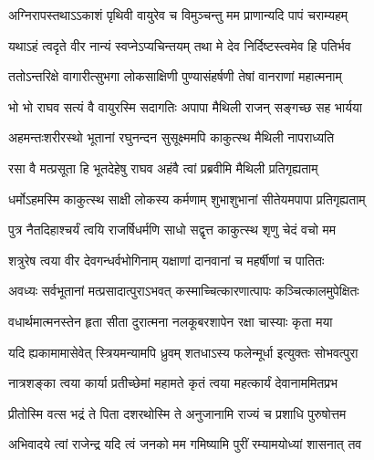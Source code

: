 \twolineshloka
{अग्निरापस्तथाऽऽकाशं पृथिवी वायुरेव च}
{विमुञ्चन्तु मम प्राणान्यदि पापं चराम्यहम्}


\twolineshloka
{यथाऽहं त्वदृते वीर नान्यं स्वप्नेऽप्यचिन्तयम्}
{तथा मे देव निर्दिष्टस्त्वमेव हि पतिर्भव}


\twolineshloka
{ततोऽन्तरिक्षे वागारीत्सुभगा लोकसाक्षिणी}
{पुण्यासंहर्षणी तेषां वानराणां महात्मनाम्}


\twolineshloka
{भो भो राघव सत्यं वै वायुरस्मि सदागतिः}
{अपापा मैथिली राजन् सङ्गच्छ सह भार्यया}


\twolineshloka
{अहमन्तःशरीरस्थो भूतानां रघुनन्दन}
{सुसूक्ष्ममपि काकुत्स्थ मैथिली नापराध्यति}


\twolineshloka
{रसा वै मत्प्रसूता हि भूतदेहेषु राघव}
{अहंवै त्वां प्रब्रवीमि मैथिली प्रतिगृह्यताम्}


\twolineshloka
{धर्मोऽहमस्मि काकुत्स्थ साक्षी लोकस्य कर्मणाम्}
{शुभाशुभानां सीतेयमपापा प्रतिगृह्यताम्}


\twolineshloka
{पुत्र नैतदिहाश्चर्यं त्वयि राजर्षिधर्मणि}
{साधो सद्वृत्त काकुत्स्थ शृणु चेदं वचो मम}

\twolineshloka
{शत्रुरेष त्वया वीर देवगन्धर्वभोगिनाम्}
{यक्षाणां दानवानां च महर्षीणां च पातितः}

\twolineshloka
{अवध्यः सर्वभूतानां मत्प्रसादात्पुराऽभवत्}
{कस्माच्चित्कारणात्पापः कञ्चित्कालमुपेक्षितः}


\twolineshloka
{वधार्थमात्मनस्तेन हृता सीता दुरात्मना}
{नलकूबरशापेन रक्षा चास्याः कृता मया}


\twolineshloka
{यदि ह्यकामामासेवेत् स्त्रियमन्यामपि ध्रुवम्}
{शतधाऽस्य फलेन्मूर्धा इत्युक्तः सोभवत्पुरा}


\twolineshloka
{नात्रशङ्का त्वया कार्या प्रतीच्छेमां महामते}
{कृतं त्वया महत्कार्यं देवानाममितप्रभ}



\twolineshloka
{प्रीतोस्मि वत्स भद्रं ते पिता दशरथोस्मि ते}
{अनुजानामि राज्यं च प्रशाधि पुरुषोत्तम}



\twolineshloka
{अभिवादये त्वां राजेन्द्र यदि त्वं जनको मम}
{गमिष्यामि पुरीं रम्यामयोध्यां शासनात् तव}



